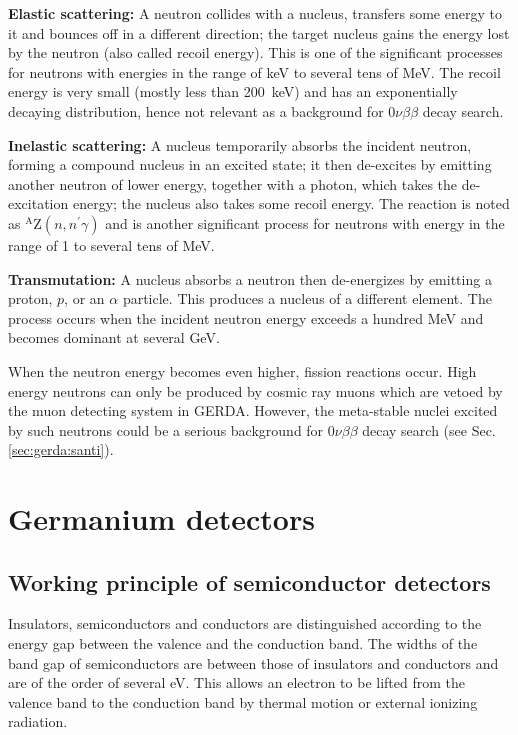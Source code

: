 \textbf{Elastic scattering:} A neutron collides with a nucleus, transfers some energy to it and bounces off in a different direction; the target nucleus gains the energy lost by the neutron (also called recoil energy). This is one of the significant processes for neutrons with energies in the range of keV to several tens of MeV. The recoil energy is very small (mostly less than 200~keV) and has an exponentially decaying distribution, hence not relevant as a background for $0\nu\beta\beta$ decay search.

\textbf{Inelastic scattering:} A nucleus temporarily absorbs the incident neutron, forming a compound nucleus in an excited state; it then de-excites by emitting another neutron of lower energy, together with a photon, which takes the de-excitation energy; the nucleus also takes some recoil energy. The reaction is noted as $^{\text{A}}$Z$(n,n^{\prime}\gamma)$ and is another significant process for neutrons with energy in the range of 1 to several tens of MeV.

\textbf{Transmutation:} A nucleus absorbs a neutron then de-energizes by emitting a proton, $p$, or an $\alpha$ particle. This produces a nucleus of a different element. The process occurs when the incident neutron energy exceeds a hundred MeV and becomes dominant at several GeV.

When the neutron energy becomes even higher, fission reactions occur. High energy neutrons can only be produced by cosmic ray muons which are vetoed by the muon detecting system in GERDA. However, the meta-stable nuclei excited by such neutrons could be a serious background for $0\nu\beta\beta$ decay search (see Sec.\ref{sec:gerda:santi}).


\section{Germanium detectors}
\label{sec:det:semi}
\subsection{Working principle of semiconductor detectors}
\label{sec:det:prin}
Insulators, semiconductors and conductors are distinguished according to the energy gap between the valence and the conduction band. The widths of the band gap of semiconductors are between those of insulators and conductors and are of the order of several eV. This allows an electron to be lifted from the valence band to the conduction band by thermal motion or external ionizing radiation.

